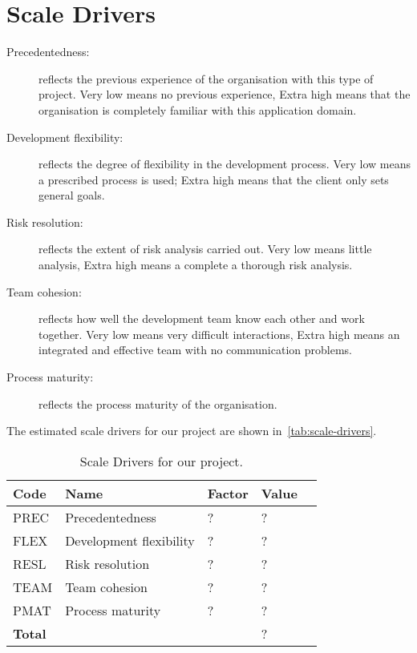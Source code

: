 \section{Scale Drivers}

\begin{description}
    
    \item[Precedentedness:] reflects the previous experience of the organisation with this type of project. Very low means no previous experience, Extra high means that the organisation is completely familiar with this application domain.

    \item[Development flexibility:] reflects the degree of flexibility in the development process. Very low means a prescribed process is used; Extra high means that the client only sets general goals.

    \item[Risk resolution:] reflects the extent of risk analysis carried out. Very low means little analysis, Extra high means a complete a thorough risk analysis.

    \item[Team cohesion:] reflects how well the development team know each other and work together. Very low means very difficult interactions, Extra high means an integrated and effective team with no communication problems.

    \item[Process maturity:] reflects the process maturity of the organisation.

\end{description}

The estimated scale drivers for our project are shown in~\autoref{tab:scale-drivers}.

\begin{table}[h]
    \centering
    \begin{tabular}{| l | l | l | l | l |}
        \hline
        \textbf{Code}   & \textbf{Name}             & \textbf{Factor}   & \textbf{Value}    \\
        \hline
        PREC            & Precedentedness           & ?                 & ?                 \\
        \hline
        FLEX            & Development flexibility   & ?                 & ?                 \\
        \hline
        RESL            & Risk resolution           & ?                 & ?                 \\
        \hline
        TEAM            & Team cohesion             & ?                 & ?                 \\
        \hline
        PMAT            & Process maturity          & ?                 & ?                 \\
        \hline
        \textbf{Total}  & \multicolumn{2}{|c|}{~}                       & ?                 \\
        \hline
    \end{tabular}
    \caption{Scale Drivers for our project.}
    \label{tab:scale-drivers}
\end{table}
